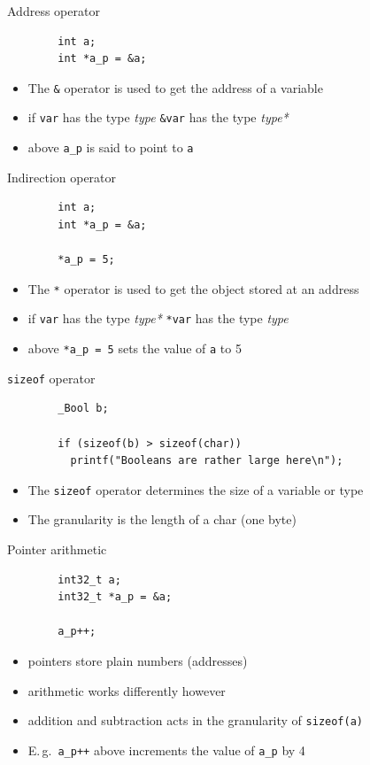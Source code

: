 \documentclass[english,compress]{beamer}
\begin{document}
\begin{frame}[fragile]{Address operator}
	\begin{lstlisting}
		int a;
		int *a_p = &a;
	\end{lstlisting}
	\begin{itemize}
		\item The \lstinline|&| operator is used to get the address of a variable
		\item if \lstinline|var| has the type {\it\color{blue}type}
			\lstinline|&var| has the type {\it\color{blue}type*}
		\item above \lstinline|a_p| is said to point to \lstinline|a|
	\end{itemize}
\end{frame}

\begin{frame}[fragile]{Indirection operator}
	\begin{lstlisting}
		int a;
		int *a_p = &a;

		*a_p = 5;
	\end{lstlisting}
	\begin{itemize}
		\item The \lstinline|*| operator is used to get the object stored at an address
		\item if \lstinline|var| has the type {\it\color{blue}type*}
			\lstinline|*var| has the type {\it\color{blue}type}
		\item above \lstinline|*a_p = 5| sets the value of \lstinline|a| to 5
	\end{itemize}
\end{frame}

\begin{frame}[fragile]{\lstinline|sizeof| operator}
	\begin{lstlisting}
		_Bool b;

		if (sizeof(b) > sizeof(char))
		  printf("Booleans are rather large here\n");
	\end{lstlisting}
	\begin{itemize}
		\item The \lstinline|sizeof| operator determines the size of a variable or type
		\item The granularity is the length of a char (one byte)
	\end{itemize}
\end{frame}

\begin{frame}[fragile]{Pointer arithmetic}
	\begin{lstlisting}
		int32_t a;
		int32_t *a_p = &a;

		a_p++;
	\end{lstlisting}
	\begin{itemize}
		\item pointers store plain numbers (addresses)
		\item arithmetic works differently however
		\item addition and subtraction acts in the granularity
			of \lstinline|sizeof(a)|
		\item E.\,g.\ \lstinline|a_p++| above increments the value
			of \lstinline|a_p| by 4
	\end{itemize}
\end{frame}
\end{document}

